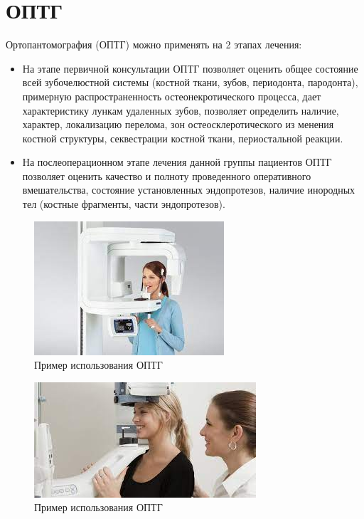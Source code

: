\documentclass[11pt]{article}
\begin{document}
	\section{ОПТГ}
	Ортопантомография (ОПТГ) можно применять на 2 этапах лечения: 
	\begin{itemize} 

	\item На этапе первичной консультации ОПТГ позволяет оценить общее состояние всей зубочелюстной системы (костной ткани, зубов, периодонта, пародонта), примерную распространенность остеонекротического процесса, дает характеристику лункам удаленных зубов, позволяет определить наличие, характер, локализацию  перелома, зон остеосклеротического из	менения костной структуры, секвестрации	костной ткани, периостальной реакции. 
	
	\item На послеоперационном этапе лечения данной группы пациентов ОПТГ позволяет оценить качество и 	полноту проведенного оперативного вмешательства, состояние установленных эндопротезов, наличие инородных тел (костные фрагменты, части эндопротезов). 
	
	\end{itemize} 

	\begin{figure}[H]
	\centering
	\includegraphics[width=\textwidth]{optg_1}
	\caption{Пример использования ОПТГ}
	\label{fig:optg_1}
	\end{figure}

	\begin{figure}[H]
	\centering
	\includegraphics[width=\textwidth]{optg_2}
	\caption{Пример использования ОПТГ}
	\label{fig:optg_2}
	\end{figure}
\end{document}
